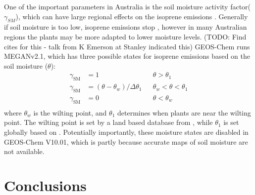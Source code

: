     One of the important parameters in Australia is the soil moisture activity factor($\gamma_{SM}$), which can have large regional effects on the isoprene emissions \parencite{Sindelarova2014,Bauwens2016}.
    Generally if soil moisture is too low, isoprene emissions stop \parencite{Pegoraro2004,Niinemets2010}, however in many Australian regions the plants may be more adapted to lower moisture levels. (TODO: Find cites for this - talk from K Emerson at Stanley indicated this)
    GEOS-Chem runs MEGANv2.1, which has three possible states for isoprene emissions based on the soil moisture ($\theta$):
    \begin{align*}
    \gamma_\mathrm{SM} & = 1 && \theta > \theta_1 \\
    \gamma_\mathrm{SM} & = (\theta-\theta_w)/\Delta\theta_1  && \theta_w < \theta < \theta_1 \\
    \gamma_\mathrm{SM} & = 0 && \theta < \theta_w \\
    \end{align*}
    where $\theta_w$ is the wilting point, and $\theta_1$ determines when plants are near the wilting point.
    The wilting point is set by a land based database from \textcite{Chen2001}, while $\theta_1$ is set globally based on \textcite{Pegoraro2004}.
    Potentially importantly, these moisture states are disabled in GEOS-Chem V10.01, which is partly because accurate maps of soil moisture are not available.

\section{Conclusions}
  \label{BioIsop:Conclusions}
  
%  
  